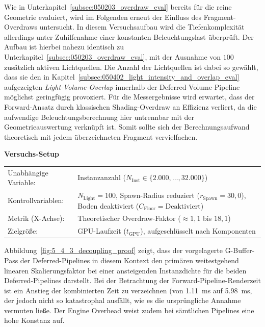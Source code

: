 Wie in Unterkapitel~\ref{subsec:050203_overdraw_eval} bereits für die reine Geometrie evaluiert, wird im Folgenden
erneut der Einfluss des Fragment-Overdraws untersucht.
In diesem Versuchsaufbau wird die Tiefenkomplexität allerdings unter Zuhilfenahme einer konstanten Beleuchtungslast
überprüft.
Der Aufbau ist hierbei nahezu identisch zu Unterkapitel~\ref{subsec:050203_overdraw_eval}, mit der Ausnahme von $100$
zusätzlich aktiven Lichtquellen.
Die Anzahl der Lichtquellen ist dabei so gewählt, dass sie den in
Kapitel~\ref{subsec:050402_light_intensity_and_overlap_eval} aufgezeigten \textit{Light-Volume-Overlap} innerhalb der
Deferred-Volume-Pipeline möglichst geringfügig provoziert.
Für die Messergebnisse wird erwartet, dass der Forward-Ansatz durch klassischen Shading-Overdraw an Effizienz verliert,
da die aufwendige Beleuchtungsberechnung hier untrennbar mit der Geometrieauswertung verknüpft ist.
Somit sollte sich der Berechnungsaufwand theoretisch mit jedem überzeichneten Fragment vervielfachen.

\begin{center}
    \small
    \colorbox{gray!5}{\parbox{0.95\textwidth}{
        \centering
        \vspace{2mm}
        {\sffamily\bfseries Versuchs-Setup} \\[1.5ex]
        \begin{tabularx}{0.9\textwidth}{>{\sffamily}l X}
            Unabhängige Variable:    & Instanzanzahl ($N_{\text{Inst}} \in \{2.000, \dots, 32.000\}$) \\
            Kontrollvariablen:       & $N_{\text{Light}} = 100$, Spawn-Radius reduziert ($r_{\text{Spawn}} = 30{,}0$),
            Boden deaktiviert ($C_{\text{Floor}} = \text{Deaktiviert}$) \\
            Metrik (X-Achse):        & Theoretischer Overdraw-Faktor ($\approx 1{,}1$ bis $18{,}1$) \\
            Zielgröße:               & \ac{GPU}-Laufzeit ($t_{\text{GPU}}$), aufgeschlüsselt nach Komponenten
        \end{tabularx}
        \vspace{2mm}
    }}
\end{center}

Abbildung~\ref{fig:5_4_3_decoupling_proof} zeigt, dass der vorgelagerte \ac{G-Buffer}-Pass der Deferred-Pipelines in
diesem Kontext den primären weitestgehend linearen Skalierungsfaktor bei einer ansteigenden Instanzdichte für die beiden
Deferred-Pipelines darstellt.
Bei der Betrachtung der Forward-Pipeline-Renderzeit ist ein Anstieg der kombinierten Zeit zu verzeichnen
(von \qty{1,11}{\milli\second} auf \qty{5,98}{\milli\second}, der jedoch nicht so katastrophal ausfällt, wie es die ursprüngliche
Annahme vermuten ließe.
Der Engine Overhead weist zudem bei sämtlichen Pipelines eine hohe Konstanz auf.

